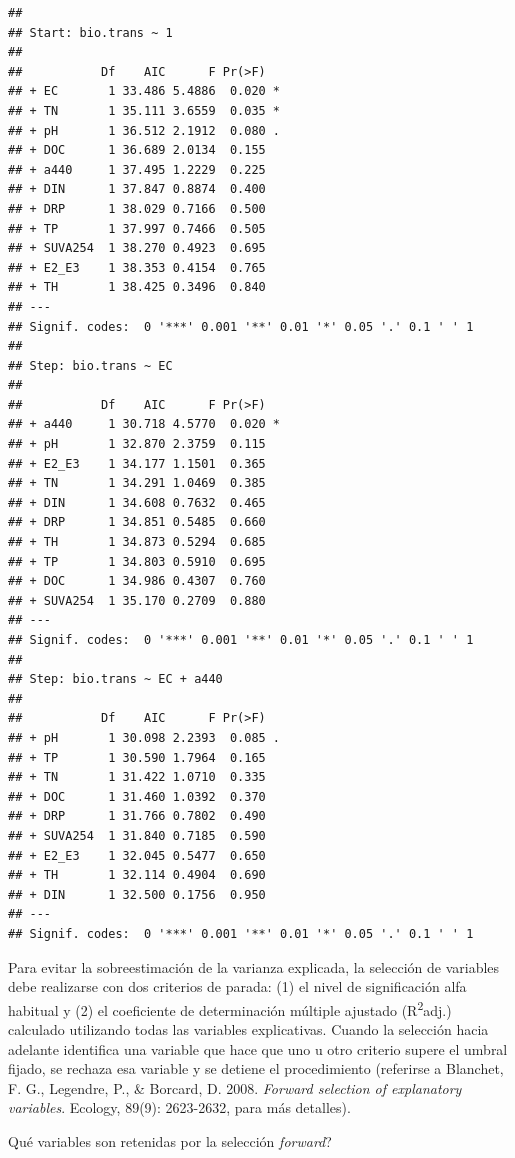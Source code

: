 \documentclass[
]{book}
\newenvironment{Shaded}{\begin{snugshade}}{\end{snugshade}}
\newcommand{\NormalTok}[1]{#1}
\newcommand{\SpecialCharTok}[1]{\textcolor[rgb]{0.00,0.00,0.00}{#1}}
\begin{document}
\begin{verbatim}
## 
## Start: bio.trans ~ 1 
## 
##           Df    AIC      F Pr(>F)  
## + EC       1 33.486 5.4886  0.020 *
## + TN       1 35.111 3.6559  0.035 *
## + pH       1 36.512 2.1912  0.080 .
## + DOC      1 36.689 2.0134  0.155  
## + a440     1 37.495 1.2229  0.225  
## + DIN      1 37.847 0.8874  0.400  
## + DRP      1 38.029 0.7166  0.500  
## + TP       1 37.997 0.7466  0.505  
## + SUVA254  1 38.270 0.4923  0.695  
## + E2_E3    1 38.353 0.4154  0.765  
## + TH       1 38.425 0.3496  0.840  
## ---
## Signif. codes:  0 '***' 0.001 '**' 0.01 '*' 0.05 '.' 0.1 ' ' 1
## 
## Step: bio.trans ~ EC 
## 
##           Df    AIC      F Pr(>F)  
## + a440     1 30.718 4.5770  0.020 *
## + pH       1 32.870 2.3759  0.115  
## + E2_E3    1 34.177 1.1501  0.365  
## + TN       1 34.291 1.0469  0.385  
## + DIN      1 34.608 0.7632  0.465  
## + DRP      1 34.851 0.5485  0.660  
## + TH       1 34.873 0.5294  0.685  
## + TP       1 34.803 0.5910  0.695  
## + DOC      1 34.986 0.4307  0.760  
## + SUVA254  1 35.170 0.2709  0.880  
## ---
## Signif. codes:  0 '***' 0.001 '**' 0.01 '*' 0.05 '.' 0.1 ' ' 1
## 
## Step: bio.trans ~ EC + a440 
## 
##           Df    AIC      F Pr(>F)  
## + pH       1 30.098 2.2393  0.085 .
## + TP       1 30.590 1.7964  0.165  
## + TN       1 31.422 1.0710  0.335  
## + DOC      1 31.460 1.0392  0.370  
## + DRP      1 31.766 0.7802  0.490  
## + SUVA254  1 31.840 0.7185  0.590  
## + E2_E3    1 32.045 0.5477  0.650  
## + TH       1 32.114 0.4904  0.690  
## + DIN      1 32.500 0.1756  0.950  
## ---
## Signif. codes:  0 '***' 0.001 '**' 0.01 '*' 0.05 '.' 0.1 ' ' 1
\end{verbatim}

Para evitar la sobreestimación de la varianza explicada, la selección de variables debe realizarse con dos criterios de parada: (1) el nivel de significación alfa habitual y (2) el coeficiente de determinación múltiple ajustado (R\textsuperscript{2}adj.) calculado utilizando todas las variables explicativas. Cuando la selección hacia adelante identifica una variable que hace que uno u otro criterio supere el umbral fijado, se rechaza esa variable y se detiene el procedimiento (referirse a Blanchet, F. G., Legendre, P., \& Borcard, D. 2008. \emph{Forward selection of explanatory variables}. Ecology, 89(9): 2623-2632, para más detalles).

Qué variables son retenidas por la selección \emph{forward}?

\begin{Shaded}
\end{Shaded}
\end{document}
